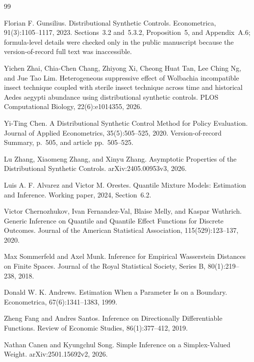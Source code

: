\documentclass{article}
\begin{document}
\begin{thebibliography}{99}

   Florian F. Gunsilius. Distributional Synthetic Controls. Econometrica, 91(3):1105--1117, 2023. Sections~3.2 and~5.3.2, Proposition~5, and Appendix~A.6; formula-level details were checked only in the public manuscript because the version-of-record full text was inaccessible.

   Yichen Zhai, Chia-Chen Chang, Zhiyong Xi, Cheong Huat Tan, Lee Ching Ng, and Jue Tao Lim. Heterogeneous suppressive effect of Wolbachia incompatible insect technique coupled with sterile insect technique across time and historical Aedes aegypti abundance using distributional synthetic controls. PLOS Computational Biology, 22(6):e1014355, 2026.

   Yi-Ting Chen. A Distributional Synthetic Control Method for Policy Evaluation. Journal of Applied Econometrics, 35(5):505--525, 2020. Version-of-record Summary, p.~505, and article pp.~505--525.

   Lu Zhang, Xiaomeng Zhang, and Xinyu Zhang. Asymptotic Properties of the Distributional Synthetic Controls. arXiv:2405.00953v3, 2026.

   Luis A. F. Alvarez and Victor M. Orestes. Quantile Mixture Models: Estimation and Inference. Working paper, 2024, Section~6.2.

   Victor Chernozhukov, Ivan Fernandez-Val, Blaise Melly, and Kaspar Wuthrich. Generic Inference on Quantile and Quantile Effect Functions for Discrete Outcomes. Journal of the American Statistical Association, 115(529):123--137, 2020.

   Max Sommerfeld and Axel Munk. Inference for Empirical Wasserstein Distances on Finite Spaces. Journal of the Royal Statistical Society, Series B, 80(1):219--238, 2018.

   Donald W. K. Andrews. Estimation When a Parameter Is on a Boundary. Econometrica, 67(6):1341--1383, 1999.

   Zheng Fang and Andres Santos. Inference on Directionally Differentiable Functions. Review of Economic Studies, 86(1):377--412, 2019.

   Nathan Canen and Kyungchul Song. Simple Inference on a Simplex-Valued Weight. arXiv:2501.15692v2, 2026.


\end{thebibliography}
\end{document}
